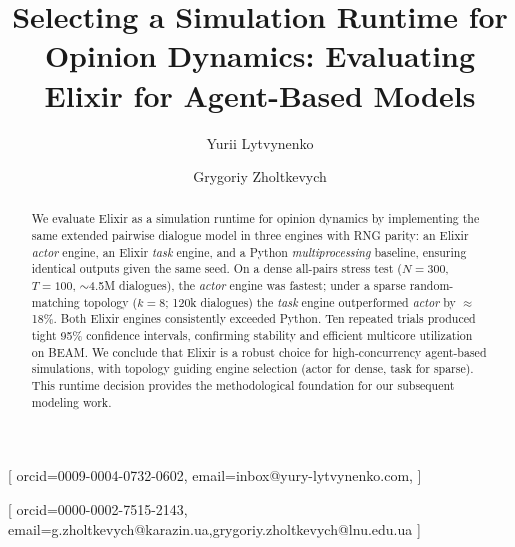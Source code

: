 \documentclass[
]{ceurart}
\begin{document}




\author[1]{Yurii Lytvynenko}[%
orcid=0009-0004-0732-0602, %
email=inbox@yury-lytvynenko.com,
]
\cormark[1]
\fnmark[1]

\author[1,2]{Grygoriy Zholtkevych}[%
orcid=0000-0002-7515-2143, %
email={g.zholtkevych@karazin.ua,grygoriy.zholtkevych@lnu.edu.ua}
]
\fnmark[1]
\address[1]{V.N. Karazin Kharkiv National University,
  4 Svobody sq., Kharkiv, 61022, Ukraine}
\address[2]{Ivan Franko National University of Lviv,
  1 Universyteska Str., Lviv, 79007, Ukraine}




\title{Selecting a Simulation Runtime for Opinion Dynamics: Evaluating Elixir for Agent-Based Models}


\begin{abstract}
We evaluate Elixir as a simulation runtime for opinion dynamics by implementing the same extended pairwise dialogue model in three engines with RNG parity: an Elixir \emph{actor} engine, an Elixir \emph{task} engine, and a Python \emph{multiprocessing} baseline, ensuring identical outputs given the same seed. On a dense all-pairs stress test (\(N{=}300\), \(T{=}100\), \(\sim\)4.5M dialogues), the \emph{actor} engine was fastest; under a sparse random-matching topology (\(k{=}8\); 120k dialogues) the \emph{task} engine outperformed \emph{actor} by \(\approx\)18\%. Both Elixir engines consistently exceeded Python. Ten repeated trials produced tight 95\% confidence intervals, confirming stability and efficient multicore utilization on BEAM. We conclude that Elixir is a robust choice for high-concurrency agent-based simulations, with topology guiding engine selection (actor for dense, task for sparse). This runtime decision provides the methodological foundation for our subsequent modeling work.
\end{abstract}
\end{document}
